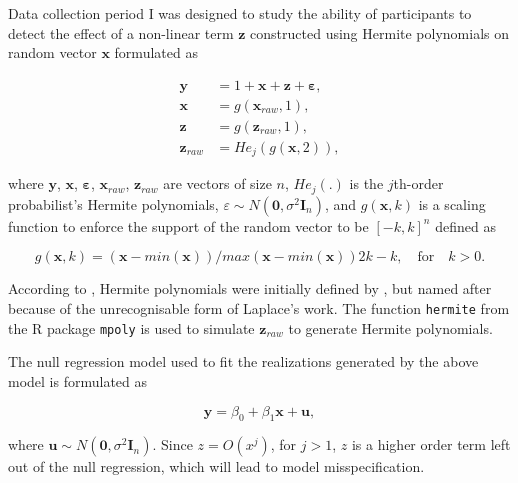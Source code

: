 \documentclass[]{interact}
\theoremstyle{plain}%
\theoremstyle{definition}
\theoremstyle{remark}
\begin{document}
Data collection period I was designed to study the ability of
participants to detect the effect of a non-linear term
\(\boldsymbol{z}\) constructed using Hermite polynomials on random
vector \(\boldsymbol{x}\) formulated as

\begin{align*} \label{eq:nonlinearity-model}
\boldsymbol{y} &= 1 + \boldsymbol{x} + \boldsymbol{z} + \boldsymbol{\varepsilon},\\
\boldsymbol{x} &= g(\boldsymbol{x}_{raw}, 1), \\
\boldsymbol{z} &= g(\boldsymbol{z}_{raw}, 1), \\
\boldsymbol{z}_{raw} &= He_j(g(\boldsymbol{x}, 2)),
\end{align*}

\noindent where \(\boldsymbol{y}\), \(\boldsymbol{x}\),
\(\boldsymbol{\varepsilon}\), \(\boldsymbol{x}_{raw}\),
\(\boldsymbol{z}_{raw}\) are vectors of size \(n\), \(He_{j}(.)\) is the
\(j\)th-order probabilist's Hermite polynomials,
\(\varepsilon \sim N(\boldsymbol{0}, \sigma^2\boldsymbol{I}_n)\), and
\(g(\boldsymbol{x}, k)\) is a scaling function to enforce the support of
the random vector to be \([-k, k]^n\) defined as

\begin{equation} \label{eq:scaling-function}
g(\boldsymbol{x}, k) = (\boldsymbol{x} - min(\boldsymbol{x}))/max(\boldsymbol{x} - min(\boldsymbol{x}))2k - k, \quad \text{for} \quad k > 0. 
\end{equation}

According to \citet{abramowitz1964handbook}, Hermite polynomials were
initially defined by \citet{de1820theorie}, but named after
\citet{hermite1864nouveau} because of the unrecognisable form of
Laplace's work. The function \texttt{hermite} from the R package
\texttt{mpoly} \citep{mpoly} is used to simulate
\(\boldsymbol{z}_{raw}\) to generate Hermite polynomials.

The null regression model used to fit the realizations generated by the
above model is formulated as

\begin{equation} \label{eq:null-model}
\boldsymbol{y} = \beta_0 + \beta_1 \boldsymbol{x} + \boldsymbol{u},
\end{equation}

\noindent where
\(\boldsymbol{u} \sim N(\boldsymbol{0}, \sigma^2\boldsymbol{I}_n)\).
Since \(z = O(x^j)\), for \(j > 1\), \(z\) is a higher order term left
out of the null regression, which will lead to model misspecification.
\end{document}
